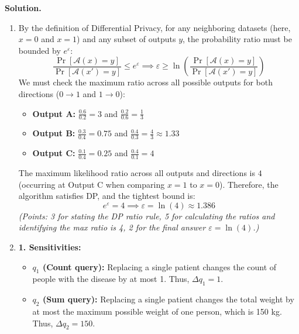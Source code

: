 \documentclass[12pt]{article}
\begin{document}
\begin{enumerate}
\begin{enumerate}
\end{enumerate}
\begin{solution}
\textbf{Solution.}\\
\begin{enumerate}
\item  By the definition of Differential Privacy, for any neighboring datasets (here, $x=0$ and $x=1$) and any subset of outputs $y$, the probability ratio must be bounded by $e^\varepsilon$:
\[
\frac{\Pr[\mathcal{A}(x) = y]}{\Pr[\mathcal{A}(x') = y]} \le e^\varepsilon \implies \varepsilon \ge \ln \left( \frac{\Pr[\mathcal{A}(x) = y]}{\Pr[\mathcal{A}(x') = y]} \right)
\]
We must check the maximum ratio across all possible outputs for both directions ($0 \to 1$ and $1 \to 0$):
\begin{itemize}
    \item \textbf{Output A:} $\frac{0.6}{0.2} = 3$ and $\frac{0.2}{0.6} = \frac{1}{3}$
    \item \textbf{Output B:} $\frac{0.3}{0.4} = 0.75$ and $\frac{0.4}{0.3} = \frac{4}{3} \approx 1.33$
    \item \textbf{Output C:} $\frac{0.1}{0.4} = 0.25$ and $\frac{0.4}{0.1} = 4$
\end{itemize}
The maximum likelihood ratio across all outputs and directions is $4$ (occurring at Output C when comparing $x=1$ to $x=0$). 
Therefore, the algorithm satisfies DP, and the tightest bound is:
\[
e^\varepsilon = 4 \implies \varepsilon = \ln(4) \approx 1.386
\]
\textit{(Points: 3 for stating the DP ratio rule, 5 for calculating the ratios and identifying the max ratio is 4, 2 for the final answer $\varepsilon = \ln(4)$.)}

\item 
\textbf{1. Sensitivities:}
\begin{itemize}
    \item \textbf{$q_1$ (Count query):} Replacing a single patient changes the count of people with the disease by at most 1. Thus, $\Delta q_1 = 1$.
    \item \textbf{$q_2$ (Sum query):} Replacing a single patient changes the total weight by at most the maximum possible weight of one person, which is 150 kg. Thus, $\Delta q_2 = 150$.
\end{itemize}


\end{enumerate}
\end{solution}
\end{enumerate}
\end{document}
